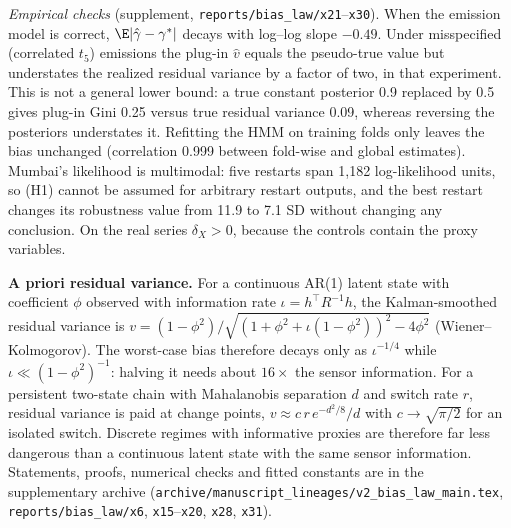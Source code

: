 \emph{Empirical checks} (supplement, \texttt{reports/bias\_law/x21}--\texttt{x30}). When the emission model is correct, $\E|\hat\gamma-\gamma^*|$ decays with log--log slope $-0.49$. Under misspecified (correlated $t_5$) emissions the plug-in $\hat v$ equals the pseudo-true value but understates the realized residual variance by a factor of two, in that experiment. This is not a general lower bound: a true constant posterior 0.9 replaced by 0.5 gives plug-in Gini 0.25 versus true residual variance 0.09, whereas reversing the posteriors understates it. Refitting the HMM on training folds only leaves the bias unchanged (correlation 0.999 between fold-wise and global estimates). Mumbai's likelihood is multimodal: five restarts span 1{,}182 log-likelihood units, so (H1) cannot be assumed for arbitrary restart outputs, and the best restart changes its robustness value from 11.9 to 7.1 SD without changing any conclusion. On the real series $\delta_X>0$, because the controls contain the proxy variables.

\textbf{A priori residual variance.} For a continuous AR(1) latent state with coefficient $\phi$ observed with information rate $\iota=h^\top R^{-1}h$, the Kalman-smoothed residual variance is $v=(1-\phi^2)/\sqrt{(1+\phi^2+\iota(1-\phi^2))^2-4\phi^2}$ (Wiener--Kolmogorov). The worst-case bias therefore decays only as $\iota^{-1/4}$ while $\iota\ll(1-\phi^2)^{-1}$: halving it needs about $16\times$ the sensor information. For a persistent two-state chain with Mahalanobis separation $d$ and switch rate $r$, residual variance is paid at change points, $v\approx c\,r\,e^{-d^2/8}/d$ with $c\to\sqrt{\pi/2}$ for an isolated switch. Discrete regimes with informative proxies are therefore far less dangerous than a continuous latent state with the same sensor information. Statements, proofs, numerical checks and fitted constants are in the supplementary archive (\texttt{archive/manuscript\_lineages/v2\_bias\_law\_main.tex}, \texttt{reports/bias\_law/x6}, \texttt{x15}--\texttt{x20}, \texttt{x28}, \texttt{x31}).

